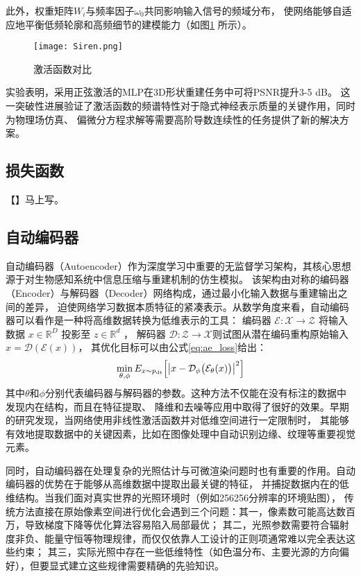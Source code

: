 此外，权重矩阵$W_i$与频率因子$\omega_0$共同影响输入信号的频域分布，
使网络能够自适应地平衡低频轮廓和高频细节的建模能力（如图\ref{fig:siren_compare} 所示）。

\begin{figure}[htb]
  \centering
  \texttt{[image: Siren.png]}
  \caption{激活函数对比\cite{sitzmann2020implicit}}
  \label{fig:siren_compare}
\end{figure}

实验\cite{sitzmann2020implicit}表明，采用正弦激活的MLP在3D形状重建任务中可将PSNR提升3-5 dB。
这一突破性进展验证了激活函数的频谱特性对于隐式神经表示质量的关键作用，同时为物理场仿真、
偏微分方程求解等需要高阶导数连续性的任务提供了新的解决方案。

\subsection{损失函数}
【】马上写。

\subsection{自动编码器} \label{sec:auto_encoder}
自动编码器（Autoencoder）作为深度学习中重要的无监督学习架构，其核心思想源于对生物感知系统中信息压缩与重建机制的仿生模拟。
该架构由对称的编码器（Encoder）与解码器（Decoder）网络构成，通过最小化输入数据与重建输出之间的差异，
迫使网络学习数据本质特征的紧凑表示。从数学角度来看，自动编码器可以看作是一种将高维数据转换为低维表示的工具：
编码器 $\mathcal{E}:\mathcal{X}\rightarrow\mathcal{Z}$ 将输入数据 $x\in\mathbb{R}^D$ 投影至 $z\in\mathbb{R}^d$ ，
解码器 $\mathcal{D}:\mathcal{Z}\rightarrow\mathcal{X}$则试图从潜在编码重构原始输入 $\hat{x}=\mathcal{D}\left(\mathcal{E}\left(x\right)\right)$，
其优化目标可以由公式\eqref{eq:ae_loss}给出：
\begin{equation}\label{eq:ae_loss}
\min_{\theta,\phi}E_{x\sim p_{\mathrm{dt}}}\Bigl[\bigl|x-\mathcal{D}_\phi\bigl(\mathcal{E}_\theta(x)\bigr)\bigr|^2\Bigr]
\end{equation}
其中$\theta$和$\phi$分别代表编码器与解码器的参数。这种方法不仅能在没有标注的数据中发现内在结构，而且在特征提取、
降维和去噪等应用中取得了很好的效果。早期的研究\cite{Hinton_2006}发现，当网络使用非线性激活函数并对低维空间进行一定限制时，
其能够有效地提取数据中的关键因素，比如在图像处理中自动识别边缘、纹理等重要视觉元素。

同时，自动编码器在处理复杂的光照估计与可微渲染问题时也有重要的作用。自动编码器的优势在于能够从高维数据中提取出最关键的特征，
并捕捉数据内在的低维结构。当我们面对真实世界的光照环境时（例如256\times256分辨率的环境贴图），
传统方法直接在原始像素空间进行优化会遇到三个问题：其一，像素数可能高达数百万，导致梯度下降等优化算法容易陷入局部最优；
其二，光照参数需要符合辐射度非负、能量守恒等物理规律，而仅仅依靠人工设计的正则项通常难以完全表达这些约束；
其三，实际光照中存在一些低维特性（如色温分布、主要光源的方向偏好），但要显式建立这些规律需要精确的先验知识。

